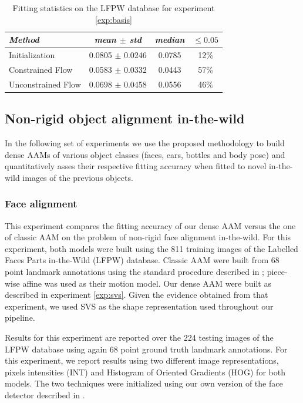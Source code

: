 \begin{table}[t]
\small
\centering
\begin{tabular}{|l|c|c|c|}
\hline
\emph{Method}       & \emph{mean $\pm$ std} & \emph{median} & $\leq 0.05$\\
\hline\hline
Initialization      & 0.0805 $\pm$ 0.0246 & 0.0785 & 12\%\\
Constrained Flow    & 0.0583 $\pm$ 0.0332 & 0.0443 & 57\%\\
Unconstrained Flow  & 0.0698 $\pm$ 0.0458 & 0.0556 & 46\%\\
\hline
\end{tabular}
\caption{Fitting statistics on the LFPW database for experiment \ref{exp:basis}}
\label{tab:basis_stats}
\end{table}



\subsection{Non-rigid object alignment in-the-wild}
\label{exp:alignment}

In the following set of experiments we use the proposed methodology to build dense AAMs of various object classes (faces, ears, bottles and body pose) and quantitatively asses their respective fitting accuracy when fitted to novel in-the-wild images of the previous objects.

\subsubsection{Face alignment}
\label{exp:face}

This experiment compares the fitting accuracy of our dense AAM versus the one of classic AAM on the problem of non-rigid face alignment in-the-wild. For this experiment, both models were built using the 811 training images of the Labelled Faces Parts in-the-Wild (LFPW) \cite{Belhumeur2011} database. Classic AAM were built from 68 point landmark annotations using the standard procedure described in \cite{Cootes2001, Matthews2004}; piece-wise affine was used as their motion model. Our dense AAM were built as described in experiment \ref{exp:svs}. Given the evidence obtained from that experiment, we used SVS as the shape representation used throughout our pipeline.

Results for this experiment are reported over the 224 testing images of the LFPW database using again 68 point ground truth landmark annotations. For this experiment, we report results using two different image representations, \ie pixels intensities (INT) and Histogram of Oriented Gradients (HOG) \cite{Dalal2005} for both models. The two techniques were initialized using our own version of the face detector described in \cite{Zhu2012}.

